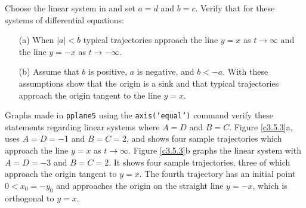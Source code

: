 \documentclass{ximera}
\begin{document}
\begin{computerExercise} \label{c3.5.3}
Choose the {\sf linear system} in {\pplane} and set
$a=d$ and $b=c$.  Verify that for these systems of differential
equations:
\begin{itemize}
\item[(a)]  When $|a|<b$ typical trajectories approach the line
$y=x$ as $t\to\infty$ and the line $y=-x$ as $t\to -\infty$.
\item[(b)]  Assume that $b$ is positive, $a$ is negative, and $b<-a$. 
With these assumptions show that the origin is a sink and that typical 
trajectories approach the origin tangent to the line $y=x$.
\end{itemize}

\begin{solution}

Graphs made in {\tt pplane5} using the {\tt axis('equal')} command
verify these statements regarding linear systems where $A = D$
and $B = C$.  Figure \ref{c3.5.3}a, uses $A = D = -1$ and
$B = C = 2$, and shows four sample trajectories which approach
the line $y = x$ as $t \rightarrow \infty$.  Figure
\ref{c3.5.3}b graphs the linear system with $A = D = -3$
and $B = C = 2$.  It shows four sample trajectories, three of
which approach the origin tangent to $y = x$.  The fourth
trajectory has an initial point $0 < x_0 = -y_0$ and approaches
the origin on the straight line $y = -x$, which is orthogonal
to $y = x$.
\begin{figure}[htb]
                       \centerline{%
                       }
\end{figure}

\end{solution}
\end{computerExercise}
\end{document}
